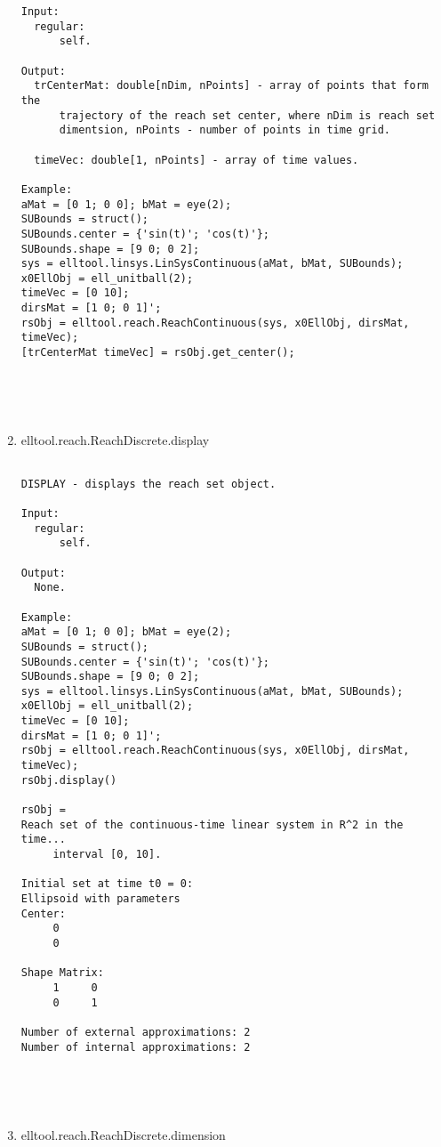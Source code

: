 \begin{enumerate}
\begin{lstlisting}
Input:
  regular:
      self.

Output:
  trCenterMat: double[nDim, nPoints] - array of points that form the
      trajectory of the reach set center, where nDim is reach set
      dimentsion, nPoints - number of points in time grid.

  timeVec: double[1, nPoints] - array of time values.

Example:
aMat = [0 1; 0 0]; bMat = eye(2);
SUBounds = struct();
SUBounds.center = {'sin(t)'; 'cos(t)'};
SUBounds.shape = [9 0; 0 2];
sys = elltool.linsys.LinSysContinuous(aMat, bMat, SUBounds);
x0EllObj = ell_unitball(2);
timeVec = [0 10];
dirsMat = [1 0; 0 1]';
rsObj = elltool.reach.ReachContinuous(sys, x0EllObj, dirsMat, timeVec);
[trCenterMat timeVec] = rsObj.get_center();





\end{lstlisting}
\fontfamily{\familydefault}
\selectfont
\item {elltool.reach.ReachDiscrete.display}
\selectfont
\begin{lstlisting}

DISPLAY - displays the reach set object.

Input:
  regular:
      self.

Output:
  None.

Example:
aMat = [0 1; 0 0]; bMat = eye(2);
SUBounds = struct();
SUBounds.center = {'sin(t)'; 'cos(t)'};
SUBounds.shape = [9 0; 0 2];
sys = elltool.linsys.LinSysContinuous(aMat, bMat, SUBounds);
x0EllObj = ell_unitball(2);
timeVec = [0 10];
dirsMat = [1 0; 0 1]';
rsObj = elltool.reach.ReachContinuous(sys, x0EllObj, dirsMat, timeVec);
rsObj.display()

rsObj =
Reach set of the continuous-time linear system in R^2 in the time...
     interval [0, 10].

Initial set at time t0 = 0:
Ellipsoid with parameters
Center:
     0
     0

Shape Matrix:
     1     0
     0     1

Number of external approximations: 2
Number of internal approximations: 2





\end{lstlisting}
\fontfamily{\familydefault}
\selectfont
\item {elltool.reach.ReachDiscrete.dimension}
\selectfont
\begin{lstlisting}


\end{lstlisting}
\end{enumerate}
